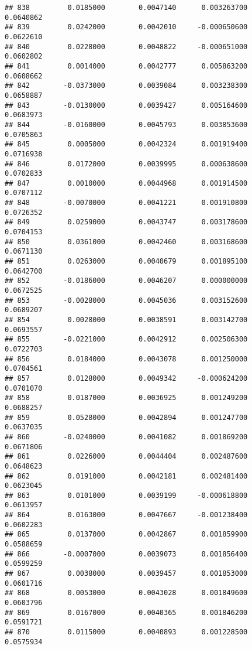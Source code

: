 \documentclass[
]{article}
\begin{document}
\begin{verbatim}
## 838         0.0185000        0.0047140      0.003263700             0.0640862
## 839         0.0242000        0.0042010     -0.000650600             0.0622610
## 840         0.0228000        0.0048822     -0.000651000             0.0602802
## 841         0.0014000        0.0042777      0.005863200             0.0608662
## 842        -0.0373000        0.0039084      0.003238300             0.0658887
## 843        -0.0130000        0.0039427      0.005164600             0.0683973
## 844        -0.0160000        0.0045793      0.003853600             0.0705863
## 845         0.0005000        0.0042324      0.001919400             0.0716938
## 846         0.0172000        0.0039995      0.000638600             0.0702833
## 847         0.0010000        0.0044968      0.001914500             0.0707112
## 848        -0.0070000        0.0041221      0.001910800             0.0726352
## 849         0.0259000        0.0043747      0.003178600             0.0704153
## 850         0.0361000        0.0042460      0.003168600             0.0671130
## 851         0.0263000        0.0040679      0.001895100             0.0642700
## 852        -0.0186000        0.0046207      0.000000000             0.0672525
## 853        -0.0028000        0.0045036      0.003152600             0.0689207
## 854         0.0028000        0.0038591      0.003142700             0.0693557
## 855        -0.0221000        0.0042912      0.002506300             0.0722703
## 856         0.0184000        0.0043078      0.001250000             0.0704561
## 857         0.0128000        0.0049342     -0.000624200             0.0701070
## 858         0.0187000        0.0036925      0.001249200             0.0688257
## 859         0.0528000        0.0042894      0.001247700             0.0637035
## 860        -0.0240000        0.0041082      0.001869200             0.0671806
## 861         0.0226000        0.0044404      0.002487600             0.0648623
## 862         0.0191000        0.0042181      0.002481400             0.0623045
## 863         0.0101000        0.0039199     -0.000618800             0.0613957
## 864         0.0163000        0.0047667     -0.001238400             0.0602283
## 865         0.0137000        0.0042867      0.001859900             0.0588659
## 866        -0.0007000        0.0039073      0.001856400             0.0599259
## 867         0.0038000        0.0039457      0.001853000             0.0601716
## 868         0.0053000        0.0043028      0.001849600             0.0603796
## 869         0.0167000        0.0040365      0.001846200             0.0591721
## 870         0.0115000        0.0040893      0.001228500             0.0575934

\end{verbatim}
\end{document}
